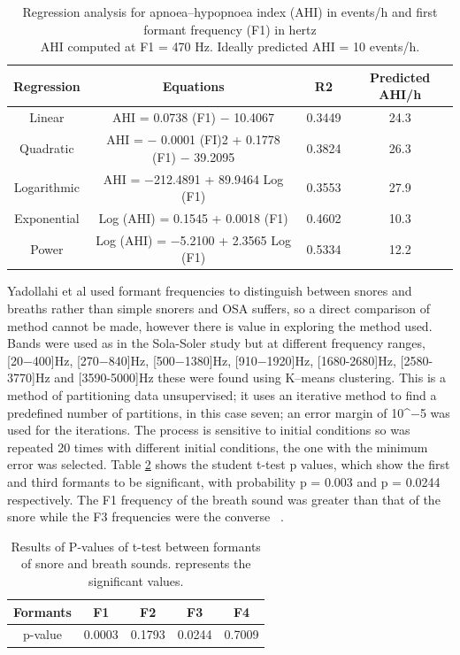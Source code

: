 \begin{table}[h]
\centering
\begin{tabular}{c c c c}
\toprule
Regression&Equations&R2&Predicted AHI/h\\ \midrule
Linear&AHI = 0.0738 (F1) − 10.4067&0.3449&24.3\\ 
Quadratic&AHI = − 0.0001 (FI)2 + 0.1778 (F1) − 39.2095&0.3824&26.3\\ 
Logarithmic&AHI = −212.4891 + 89.9464 Log (F1)&0.3553&27.9\\ 
Exponential&Log (AHI) = 0.1545 + 0.0018 (F1)&0.4602&10.3\\ 
Power&Log (AHI) = −5.2100 + 2.3565 Log (F1)&0.5334&12.2\\ \bottomrule
\end{tabular}
\caption{Regression analysis for apnoea–hypopnoea index (AHI) in events/h and first formant frequency (F1) in hertz \\ AHI computed at F1 = 470 Hz. Ideally predicted AHI = 10 events/h.}
\label{table:ng2008aformantstable2}
\end{table}
Yadollahi et al used formant frequencies to distinguish between snores and breaths rather than simple snorers and OSA suffers, so a direct comparison of method cannot be made, however there is value in exploring the method used. Bands were used as in the Sola-Soler study but at different frequency ranges, [20−400]Hz, [270−840]Hz, [500−1380]Hz, [910−1920]Hz, [1680-2680]Hz, [2580-3770]Hz and [3590-5000]Hz these were found using K–means clustering. This is a method of partitioning data unsupervised; it uses an iterative method to find a predefined number of partitions, in this case seven; an error margin of 10^{−5} was used for the iterations. The process is sensitive to initial conditions so was repeated 20 times with different initial conditions, the one with the minimum error was selected. Table \ref{table:yadollahi2009formant} shows the student t-test p values, which show the first and third formants to be significant, with probability p = 0.003 and p = 0.0244 respectively. The F1 frequency of the breath sound was greater than that of the snore while the F3 frequencies were the converse ~\cite{yadollahi2009formant}.

\begin{table}[h]
\centering
\begin{tabular}{c c c c c}
\toprule
Formants&F1&F2&F3&F4\\ \midrule
p-value&0.0003\*&0.1793&0.0244\*&0.7009\\ \bottomrule
\end{tabular}
\caption{Results of P-values of t-test between formants of snore and breath sounds. \* represents the significant values.}
\label{table:yadollahi2009formant}
\end{table}
